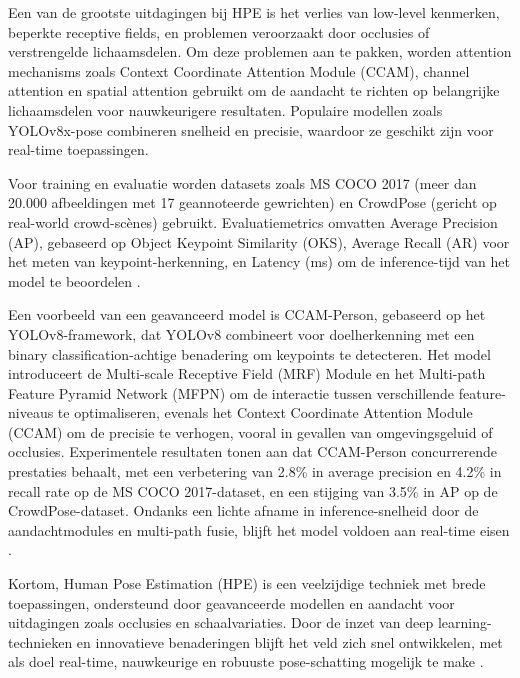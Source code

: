 Een van de grootste uitdagingen bij HPE is het verlies van low-level kenmerken, beperkte receptive fields, en problemen veroorzaakt door occlusies of verstrengelde lichaamsdelen. 
Om deze problemen aan te pakken, worden attention mechanisms zoals Context Coordinate Attention Module (CCAM), channel attention en spatial attention gebruikt om de aandacht te richten op belangrijke lichaamsdelen voor nauwkeurigere resultaten. 
Populaire modellen zoals YOLOv8x-pose combineren snelheid en precisie, waardoor ze geschikt zijn voor real-time toepassingen.

Voor training en evaluatie worden datasets zoals MS COCO 2017 (meer dan 20.000 afbeeldingen met 17 geannoteerde gewrichten) en CrowdPose (gericht op real-world crowd-scènes) gebruikt. 
Evaluatiemetrics omvatten Average Precision (AP), gebaseerd op Object Keypoint Similarity (OKS), Average Recall (AR) voor het meten van keypoint-herkenning, en Latency (ms) om de inference-tijd van het model te beoordelen \autocite{DongEtAl2024}.

Een voorbeeld van een geavanceerd model is CCAM-Person, gebaseerd op het YOLOv8-framework, dat YOLOv8 combineert voor doelherkenning met een binary classification-achtige benadering om keypoints te detecteren. Het model introduceert de Multi-scale Receptive Field (MRF) Module en het Multi-path Feature Pyramid Network (MFPN) om de interactie tussen verschillende feature-niveaus te optimaliseren, evenals het Context Coordinate Attention Module (CCAM) om de precisie te verhogen, vooral in gevallen van omgevingsgeluid of occlusies. 
Experimentele resultaten tonen aan dat CCAM-Person concurrerende prestaties behaalt, met een verbetering van 2.8\% in average precision en 4.2\% in recall rate op de MS COCO 2017-dataset, en een stijging van 3.5\% in AP op de CrowdPose-dataset. 
Ondanks een lichte afname in inference-snelheid door de aandachtmodules en multi-path fusie, blijft het model voldoen aan real-time eisen \autocite{DongEtAl2024}.

Kortom, Human Pose Estimation (HPE) is een veelzijdige techniek met brede toepassingen, ondersteund door geavanceerde modellen en aandacht voor uitdagingen zoals occlusies en schaalvariaties. 
Door de inzet van deep learning-technieken en innovatieve benaderingen blijft het veld zich snel ontwikkelen, met als doel real-time, nauwkeurige en robuuste pose-schatting mogelijk te make \autocite{DongEtAl2024}.



